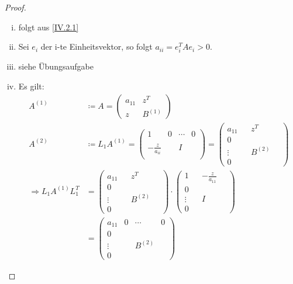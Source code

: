 \documentclass[ngerman,fontsize=11pt, paper=a4, parskip=half, titlepage=true, toc=bib]{scrbook}
\theoremstyle{definition}
\theoremstyle{plain}
\begin{document}
    	\begin{proof}~\\
    		\begin{enumerate}[i)]
    			\item folgt aus \eqref{IV.2.1}
    			\item Sei $e_i$ der i-te Einheitsvektor, so folgt $a_{ii} = e_{i}^TAe_i > 0$.
    			\item siehe Übungsaufgabe
    			\item Es gilt:
    			\begin{align*}
    			A^{(1)} &\coloneqq A = \begin{pmatrix}
    			a_{11} & z^T \\ 
    			z			& B^{(1)}
    			\end{pmatrix} \\
    			A^{(2)}	&\coloneqq L_1 A^{(1)} 
    			= \begin{pmatrix}
    			1 & 0 & \dotsm & 0 \\ \\
    			-\frac{z}{a_{ii}} && I \\ ~
    			\end{pmatrix} 
    			= \begin{pmatrix}
    			a_{11} &  & z^T & ~ \\ 
    			0 \\
    			\vdots && B^{(2)} \\ 
    			0
    			\end{pmatrix} \\
    			\Rightarrow L_1A^{(1)}L_1^T  
    			&= \begin{pmatrix}
    			a_{11} &  & z^T & ~ \\ 
    			0 \\
    			\vdots && B^{(2)} \\ 
    			0
    			\end{pmatrix} 
    			\cdot  \begin{pmatrix}
    			1 &  &	-\frac{z}{a_{11}} & ~ \\ 
    			0 \\
    			\vdots && I \\ 
    			0
    			\end{pmatrix}\\
    			&= \begin{pmatrix}
    			a_{11} & 0 & \cdots & 0\\ 
    			0 \\
    			\vdots && B^{(2)} \\ 
    			0
    			\end{pmatrix} 

\end{align*}
\end{enumerate}
\end{proof}
\end{document}
